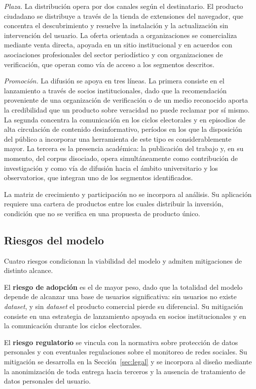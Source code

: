 \textit{Plaza.} La distribución opera por dos canales según el destinatario. El producto ciudadano se distribuye a través de la tienda de extensiones del navegador, que concentra el descubrimiento y resuelve la instalación y la actualización sin intervención del usuario. La oferta orientada a organizaciones se comercializa mediante venta directa, apoyada en un sitio institucional y en acuerdos con asociaciones profesionales del sector periodístico y con organizaciones de verificación, que operan como vía de acceso a los segmentos descritos.

\textit{Promoción.} La difusión se apoya en tres líneas. La primera consiste en el lanzamiento a través de socios institucionales, dado que la recomendación proveniente de una organización de verificación o de un medio reconocido aporta la credibilidad que un producto sobre veracidad no puede reclamar por sí mismo. La segunda concentra la comunicación en los ciclos electorales y en episodios de alta circulación de contenido desinformativo, períodos en los que la disposición del público a incorporar una herramienta de este tipo es considerablemente mayor. La tercera es la presencia académica: la publicación del trabajo y, en su momento, del corpus disociado, opera simultáneamente como contribución de investigación y como vía de difusión hacia el ámbito universitario y los observatorios, que integran uno de los segmentos identificados.

La matriz de crecimiento y participación \parencite{Henderson1970} no se incorpora al análisis. Su aplicación requiere una cartera de productos entre los cuales distribuir la inversión, condición que no se verifica en una propuesta de producto único.

\subsection{Riesgos del modelo}

Cuatro riesgos condicionan la viabilidad del modelo y admiten mitigaciones de distinto alcance.

El \textbf{riesgo de adopción} es el de mayor peso, dado que la totalidad del modelo depende de alcanzar una base de usuarios significativa: sin usuarios no existe \textit{dataset}, y sin \textit{dataset} el producto comercial pierde su diferencial. Su mitigación consiste en una estrategia de lanzamiento apoyada en socios institucionales y en la comunicación durante los ciclos electorales.

El \textbf{riesgo regulatorio} se vincula con la normativa sobre protección de datos personales y con eventuales regulaciones sobre el monitoreo de redes sociales. Su mitigación se desarrolla en la Sección~\ref{sec:legal} y se incorpora al diseño mediante la anonimización de toda entrega hacia terceros y la ausencia de tratamiento de datos personales del usuario.

